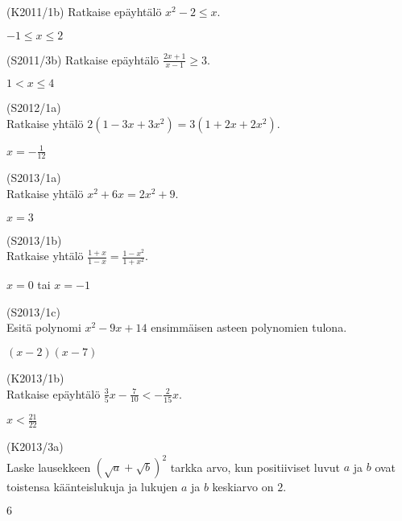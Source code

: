 \begin{tehtava}
(K2011/1b) Ratkaise epäyhtälö $x^2-2 \leq x$.
\begin{vastaus}
$-1 \leq x \leq 2$
\end{vastaus}
\end{tehtava}

\begin{tehtava}
  (S2011/3b) Ratkaise epäyhtälö $\frac{2x+1}{x-1} \geq 3$.
\begin{vastaus}
$1<x \leq 4$
\end{vastaus}
\end{tehtava}

\begin{tehtava}
(S2012/1a) \\ Ratkaise yhtälö $2(1-3x+3x^2) = 3(1+2x+2x^2)$.
\begin{vastaus}
$x=-\frac{1}{12}$
\end{vastaus}
\end{tehtava}

\begin{tehtava}
(S2013/1a) \\ Ratkaise yhtälö $x^2+6x=2x^2+9$.
\begin{vastaus}
$x=3$
\end{vastaus}
\end{tehtava}

\begin{tehtava}
(S2013/1b) \\ Ratkaise yhtälö $\frac{1+x}{1-x}=\frac{1-x^2}{1+x^2}$.
\begin{vastaus}
$x=0$ tai $x=-1$
\end{vastaus}
\end{tehtava}

\begin{tehtava}
(S2013/1c) \\ Esitä polynomi $x^2-9x+14$ ensimmäisen asteen polynomien tulona.
\begin{vastaus}
$(x-2)(x-7)$
\end{vastaus}
\end{tehtava}

\begin{tehtava}
(K2013/1b) \\ Ratkaise epäyhtälö $\frac{3}{5}x-\frac{7}{10} < -\frac{2}{15}x$.
\begin{vastaus}
$x<\frac{21}{22}$
\end{vastaus}
\end{tehtava}

\begin{tehtava}
(K2013/3a) \\ Laske lausekkeen $(\sqrt{a}+\sqrt{b})^2$ tarkka arvo, kun positiiviset luvut $a$ ja $b$ ovat toistensa käänteislukuja ja lukujen $a$ ja $b$ keskiarvo on $2$.
\begin{vastaus}
$6$
\end{vastaus}
\end{tehtava}

